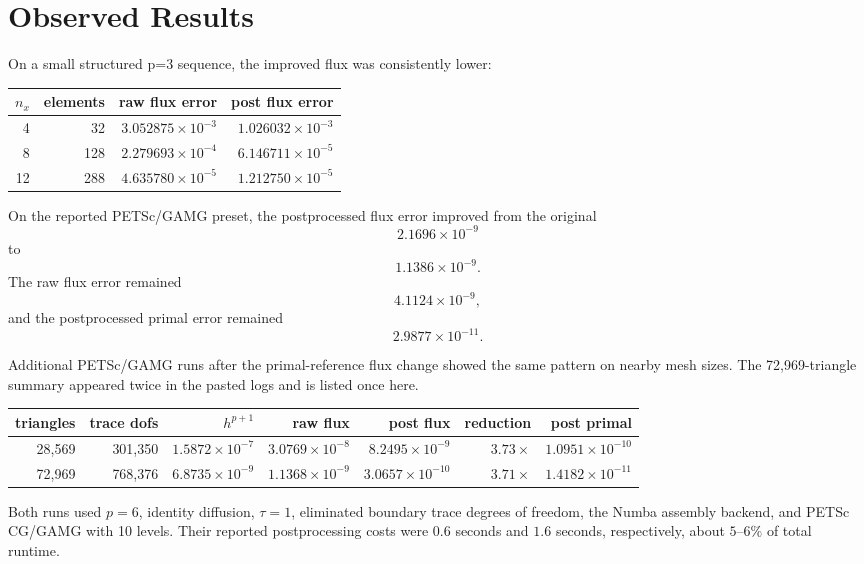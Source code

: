 \documentclass[11pt]{article}
\begin{document}
\section{Observed Results}

On a small structured p=3 sequence, the improved flux was consistently lower:
\begin{center}
\begin{tabular}{rrrr}
\toprule
$n_x$ & elements & raw flux error & post flux error \\
\midrule
4  & 32  & $3.052875 \times 10^{-3}$ & $1.026032 \times 10^{-3}$ \\
8  & 128 & $2.279693 \times 10^{-4}$ & $6.146711 \times 10^{-5}$ \\
12 & 288 & $4.635780 \times 10^{-5}$ & $1.212750 \times 10^{-5}$ \\
\bottomrule
\end{tabular}
\end{center}

On the reported PETSc/GAMG preset, the postprocessed flux error improved from
the original
\[
2.1696 \times 10^{-9}
\]
to
\[
1.1386 \times 10^{-9}.
\]
The raw flux error remained
\[
4.1124 \times 10^{-9},
\]
and the postprocessed primal error remained
\[
2.9877 \times 10^{-11}.
\]

Additional PETSc/GAMG runs after the primal-reference flux change showed the
same pattern on nearby mesh sizes. The 72,969-triangle summary appeared twice
in the pasted logs and is listed once here.
\begin{center}
\small
\setlength{\tabcolsep}{4pt}
\begin{tabular}{rrrrrrr}
\toprule
triangles & trace dofs & $h^{p+1}$ & raw flux & post flux & reduction & post primal \\
\midrule
28,569 & 301,350 & $1.5872{\times}10^{-7}$ & $3.0769{\times}10^{-8}$ &
$8.2495{\times}10^{-9}$ & $3.73{\times}$ & $1.0951{\times}10^{-10}$ \\
72,969 & 768,376 & $6.8735{\times}10^{-9}$ & $1.1368{\times}10^{-9}$ &
$3.0657{\times}10^{-10}$ & $3.71{\times}$ & $1.4182{\times}10^{-11}$ \\
\bottomrule
\end{tabular}
\end{center}
Both runs used $p=6$, identity diffusion, $\tau=1$, eliminated boundary
trace degrees of freedom, the Numba assembly backend, and PETSc CG/GAMG with
10 levels. Their reported postprocessing costs were $0.6$ seconds and
$1.6$ seconds, respectively, about $5$--$6\%$ of total runtime.
\end{document}
